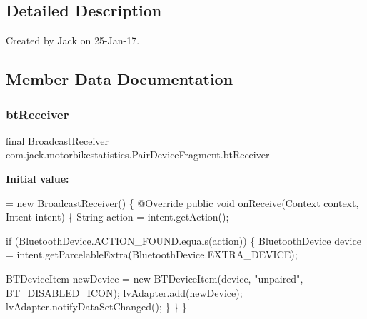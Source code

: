 \subsection{Detailed Description}
Created by Jack on 25-\/\+Jan-\/17. 

\subsection{Member Data Documentation}
\mbox{\label{classcom_1_1jack_1_1motorbikestatistics_1_1_pair_device_fragment_a73a8c234c66657d94a4382925aa91517}} 
\subsubsection{\texorpdfstring{bt\+Receiver}{btReceiver}}
{\footnotesize\ttfamily final Broadcast\+Receiver com.\+jack.\+motorbikestatistics.\+Pair\+Device\+Fragment.\+bt\+Receiver}

{\bfseries Initial value\+:}
\begin{DoxyCode}
= \textcolor{keyword}{new} BroadcastReceiver() \{
        @Override
        \textcolor{keyword}{public} \textcolor{keywordtype}{void} onReceive(Context context, Intent intent) \{
            String action = intent.getAction();

            
            \textcolor{keywordflow}{if} (BluetoothDevice.ACTION\_FOUND.equals(action))
            \{
                BluetoothDevice device = intent.getParcelableExtra(BluetoothDevice.EXTRA\_DEVICE);

                
                BTDeviceItem newDevice = \textcolor{keyword}{new} BTDeviceItem(device, \textcolor{stringliteral}{"unpaired"}, BT\_DISABLED\_ICON);
                lvAdapter.add(newDevice);
                lvAdapter.notifyDataSetChanged();
            \}
        \}
    \}
\end{DoxyCode}
\mbox{\label{classcom_1_1jack_1_1motorbikestatistics_1_1_pair_device_fragment_ad61a96414649df9171ae051c3a2d4487}} 
